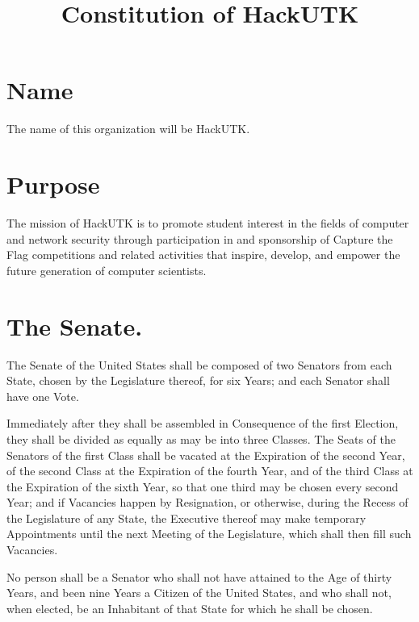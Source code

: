 \documentclass[12pt]{constitution}
\begin{document}
\title{Constitution of HackUTK}
\date{}
\maketitle
\setcounter{tocdepth}{0}
\tableofcontents
\newpage

\section{Name}
The name of this organization will be HackUTK.


\section{Purpose}
The mission of HackUTK is to promote student interest in the fields of computer and network security through participation in and sponsorship of Capture the Flag competitions and related activities that inspire, develop, and empower the future generation of computer scientists. 

\section{The Senate.}
The Senate of the United States shall be composed of two Senators from each
State, chosen by the Legislature thereof, for six Years; and each Senator shall
have one Vote.

Immediately after they shall be assembled in Consequence of the first Election,
they shall be divided as equally as may be into three Classes. The Seats of the
Senators of the first Class shall be vacated at the Expiration of the second
Year, of the second Class at the Expiration of the fourth Year, and of the
third Class at the Expiration of the sixth Year, so that one third may be
chosen every second Year; and if Vacancies happen by Resignation, or otherwise,
during the Recess of the Legislature of any State, the Executive thereof may
make temporary Appointments until the next Meeting of the Legislature, which
shall then fill such Vacancies.

No person shall be a Senator who shall not have attained to the Age of thirty
Years, and been nine Years a Citizen of the United States, and who shall not,
when elected, be an Inhabitant of that State for which he shall be chosen.
\end{document}
